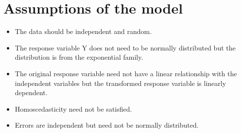 \documentclass[twoside,a4paper,12pt]{article}
\begin{document}
\section*{Assumptions of the model}
\begin{itemize}
\item The data should be independent and random.  
\end{itemize}
\begin{itemize}
\item The response variable Y does not need to be normally distributed but the distribution is from the exponential family.
\end{itemize}
\begin{itemize}
\item The original response variable need not have a linear relationship with the independent variables but the transformed response variable is linearly dependent. 
\end{itemize}
\begin{itemize}
\item Homoscedasticity need not be satisfied.
\end{itemize}
\begin{itemize}
\item Errors are independent but need not be normally distributed.
\end{itemize}





\end{document}
